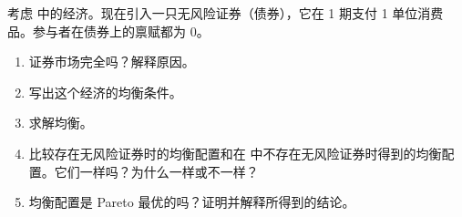 \par\noindent\begin{minipage}{\linewidth}
\begin{problem}
 考虑 中的经济。现在引入一只无风险证券（债券），它在 1 期支付 1 单位消费品。参与者在债券上的禀赋都为 0。
\begin{enumerate}[label=(\alph*)]
    \item 证券市场完全吗？解释原因。
    \item 写出这个经济的均衡条件。
    \item 求解均衡。
    \item 比较存在无风险证券时的均衡配置和在 中不存在无风险证券时得到的均衡配置。它们一样吗？为什么一样或不一样？
    \item 均衡配置是 Pareto 最优的吗？证明并解释所得到的结论。
\end{enumerate}
\end{problem}
\end{minipage}\par
{}
